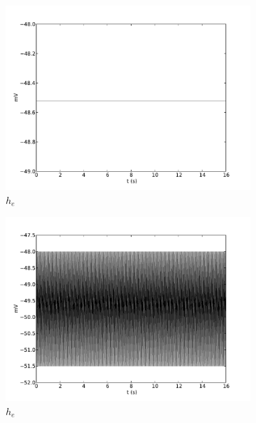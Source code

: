 \documentclass[a4paper,12pt]{article}
\begin{document}
\begin{figure}
	\begin{subfigure}[b]{0.5\textwidth}
		\includegraphics[scale=0.35]{frontiers-2012-images-revised/effect_gamma_ee_yml-00493_ode-burst-psp-res_yml-mod-res-5-1-1-1_yml-he-intra.pdf}
		\caption{$h_e$}
	\end{subfigure}
	\begin{subfigure}[b]{0.5\textwidth}
		\includegraphics[scale=0.35]{frontiers-2012-images-revised/effect_gamma_ee_yml-00493_ode-burst-psp-res_yml-mod-res-3-1-1-1_yml-he-intra.pdf}
		\caption{$h_e$}
	\end{subfigure}
	\begin{subfigure}[b]{0.5\textwidth}

\end{subfigure}
\end{figure}
\end{document}
